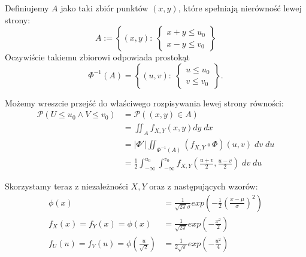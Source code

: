 Definiujemy \(A\) jako taki zbiór punktów \((x, y)\), które spełniają nierówność lewej strony:
\[
	A := \left\lbrace (x, y): \; \begin{cases} x+y \le u_0 \\ x-y \le v_0 \end{cases} \right\rbrace
\]
Oczywiście takiemu zbiorowi odpowiada prostokąt
\[
	\Phi^{-1}(A) = \left\lbrace (u, v): \; \begin{cases} u \le u_0 \\ v \le v_0 \end{cases} \right\rbrace.
\]

Możemy wreszcie przejść do właściwego rozpisywania lewej strony równości:
\begin{align*}
	\mathcal{P}(U \le u_0 \land V \le v_0) & = \mathcal{P}((x, y) \in A)                                                                                          \\
	                                       & = \iint_A f_{X,Y}(x, y) dy \; dx                                                                                     \\
	                                       & = |\Phi'| \iint_{\Phi^{-1}(A)} (f_{X,Y} \circ \Phi)(u, v) \; dv \; du                                                \\
	                                       & = \frac{1}{2} \int_{-\infty}^{u_0} \int_{-\infty}^{v_0} f_{X,Y}\left(\frac{u+v}{2}, \frac{u-v}{2}\right) \; dv \; du
\end{align*}

Skorzystamy teraz z niezależności \(X, Y\) oraz z następujących wzorów:
\begin{align*}
	\phi(x)                                               & = \frac{1}{\sqrt{2\pi}\sigma} exp\left(-\frac{1}{2}\left(\frac{x-\mu}{\sigma}\right)^2\right) \\
	f_X(x) = f_Y(x) = \phi(x)                             & = \frac{1}{\sqrt{2\pi}} exp\left(-\frac{x^2}{2}\right)                                        \\
	f_U(u) = f_V(u) = \phi\left(\frac{u}{\sqrt{2}}\right) & = \frac{1}{2\sqrt{\pi}} exp\left(-\frac{u^2}{4}\right)
\end{align*}

